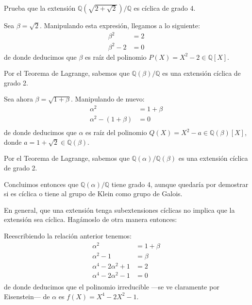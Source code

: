 \documentclass[a4paper, 11pt]{article}
\begin{document}
  \maketitle

  \begin{ejercicio}
      Prueba que la extensión $\mathbb{Q}(\sqrt{2+\sqrt{2}})/\mathbb{Q}$ es cíclica de grado 4.
  \end{ejercicio}

  \begin{solucion}
      Sea $\beta = \sqrt{2}$. Manipulando esta expresión, llegamos a lo siguiente:
      \begin{align*}
          \beta^2 &= 2 \\
          \beta^2 - 2 &= 0
      \end{align*}
      de donde deducimos que $\beta$ es raíz del polinomio $P(X) = X^2 - 2 \in \mathbb{Q}[X]$.

      Por el Teorema de Lagrange, sabemos que $\mathbb{Q}(\beta)/\mathbb{Q}$ es una extensión cíclica de grado 2.

      Sea ahora $\beta = \sqrt{1+\beta}$. Manipulando de nuevo:
      \begin{align*}
          \alpha^2 &= 1 + \beta \\
          \alpha^2 - (1 + \beta) &= 0 \\
      \end{align*}
      de donde deducimos que $\alpha$ es raíz del polinomio $Q(X) = X^2 - a \in \mathbb{Q}(\beta)[X]$, donde $a = 1 + \sqrt{2} \in \mathbb{Q}(\beta)$.

      Por el Teorema de Lagrange, sabemos que $\mathbb{Q}(\alpha)/\mathbb{Q}(\beta)$ es una extensión cíclica de grado 2.

      Concluimos entonces que $\mathbb{Q}(\alpha)/\mathbb{Q}$ tiene grado 4, aunque quedaría por demostrar si es cíclica o tiene al grupo de Klein como grupo de Galois.

      En general, que una extensión tenga subextensiones cíclicas no implica que la extensión sea cíclica. Hagámoslo de otra manera entonces:

      Reescribiendo la relación anterior tenemos:
      \begin{align*}
          \alpha^2 &= 1 + \beta \\
          \alpha^2 - 1 &= \beta \\
          \alpha^4 -2\alpha^2 + 1 &= 2 \\
          \alpha^4 -2\alpha^2 - 1 &= 0 \\
      \end{align*}
      de donde deducimos que el polinomio irreducible ---se ve claramente por Eisenstein--- de $\alpha$ es $f(X) = X^4 - 2X^2 -1$.


\end{solucion}
\end{document}
